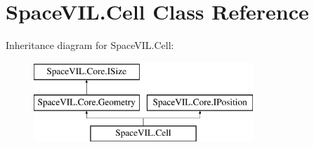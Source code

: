 \hypertarget{class_space_v_i_l_1_1_cell}{}\section{Space\+V\+I\+L.\+Cell Class Reference}
\label{class_space_v_i_l_1_1_cell}
Inheritance diagram for Space\+V\+I\+L.\+Cell\+:\begin{figure}[H]
\begin{center}
\leavevmode
\includegraphics[height=3.000000cm]{class_space_v_i_l_1_1_cell}
\end{center}
\end{figure}
